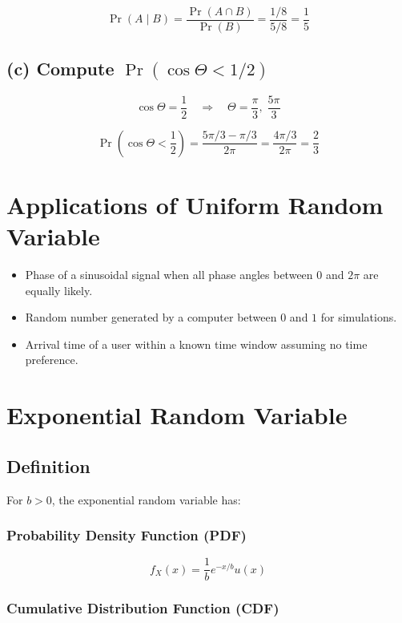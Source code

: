 \documentclass[12pt]{article}
\begin{document}
\[
\Pr(A \mid B)
= \frac{\Pr(A \cap B)}{\Pr(B)}
= \frac{1/8}{5/8}
= \frac{1}{5}
\]

\subsection*{(c) Compute $\Pr(\cos\Theta < 1/2)$}

\[
\cos\Theta = \frac{1}{2}
\quad \Rightarrow \quad
\Theta = \frac{\pi}{3}, \; \frac{5\pi}{3}
\]

\[
\Pr\left(\cos\Theta < \frac{1}{2}\right)
= \frac{5\pi/3 - \pi/3}{2\pi}
= \frac{4\pi/3}{2\pi}
= \frac{2}{3}
\]

\section{Applications of Uniform Random Variable}

\begin{itemize}
    \item Phase of a sinusoidal signal when all phase angles between $0$ and $2\pi$ are equally likely.
    \item Random number generated by a computer between $0$ and $1$ for simulations.
    \item Arrival time of a user within a known time window assuming no time preference.
\end{itemize}

\section{Exponential Random Variable}

\subsection{Definition}

For $b>0$, the exponential random variable has:

\subsubsection*{Probability Density Function (PDF)}

\[
f_X(x) = \frac{1}{b} e^{-x/b} u(x)
\]

\subsubsection*{Cumulative Distribution Function (CDF)}
\end{document}
